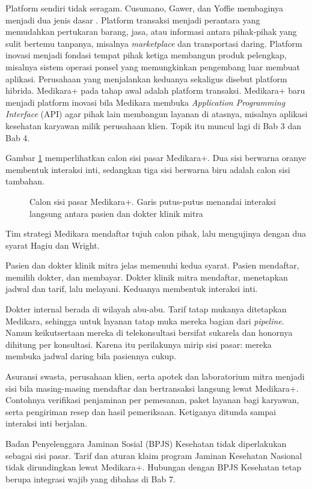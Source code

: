 Platform sendiri tidak seragam. Cusumano, Gawer, dan Yoffie membaginya menjadi
dua jenis dasar \cite{cusumano2019business}. Platform transaksi menjadi
perantara yang memudahkan pertukaran barang, jasa, atau informasi antara
pihak-pihak yang sulit bertemu tanpanya, misalnya \textit{marketplace} dan
transportasi daring. Platform inovasi menjadi fondasi tempat pihak ketiga
membangun produk pelengkap, misalnya sistem operasi ponsel yang memungkinkan
pengembang luar membuat aplikasi. Perusahaan yang menjalankan keduanya sekaligus
disebut platform hibrida. Medikara+ pada tahap awal adalah platform transaksi.
Medikara+ baru menjadi platform inovasi bila Medikara membuka
\textit{Application Programming Interface} (API) agar pihak lain membangun
layanan di atasnya, misalnya aplikasi kesehatan karyawan milik perusahaan
klien. Topik itu muncul lagi di Bab 3 dan Bab 4.

Gambar \ref{fig:ch02-sisi-pasar} memperlihatkan calon sisi pasar Medikara+.
Dua sisi berwarna oranye membentuk interaksi inti, sedangkan tiga sisi
berwarna biru adalah calon sisi tambahan.

\begin{figure}[!htb]
  \centering
  
  \caption{Calon sisi pasar Medikara+. Garis putus-putus menandai interaksi
           langsung antara pasien dan dokter klinik mitra}
  \label{fig:ch02-sisi-pasar}
\end{figure}

\begin{kasus}[title={Kasus Medikara Health: Siapa Sisi Pasar Medikara+?}]
Tim strategi Medikara mendaftar tujuh calon pihak, lalu mengujinya dengan dua
syarat Hagiu dan Wright.

Pasien dan dokter klinik mitra jelas memenuhi kedua syarat. Pasien mendaftar,
memilih dokter, dan membayar. Dokter klinik mitra mendaftar, menetapkan jadwal
dan tarif, lalu melayani. Keduanya membentuk interaksi inti.

Dokter internal berada di wilayah abu-abu. Tarif tatap mukanya ditetapkan
Medikara, sehingga untuk layanan tatap muka mereka bagian dari
\textit{pipeline}. Namun keikutsertaan mereka di telekonsultasi bersifat
sukarela dan honornya dihitung per konsultasi. Karena itu perilakunya mirip
sisi pasar: mereka membuka jadwal daring bila pasiennya cukup.

Asuransi swasta, perusahaan klien, serta apotek dan laboratorium mitra menjadi
sisi bila masing-masing mendaftar dan bertransaksi langsung lewat Medikara+.
Contohnya verifikasi penjaminan per pemesanan, paket layanan bagi karyawan,
serta pengiriman resep dan hasil pemeriksaan. Ketiganya ditunda sampai interaksi
inti berjalan.

Badan Penyelenggara Jaminan Sosial (BPJS) Kesehatan tidak diperlakukan sebagai
sisi pasar. Tarif dan aturan klaim program Jaminan Kesehatan Nasional tidak
dirundingkan lewat Medikara+. Hubungan dengan BPJS Kesehatan tetap berupa
integrasi wajib yang dibahas di Bab 7.
\end{kasus}

